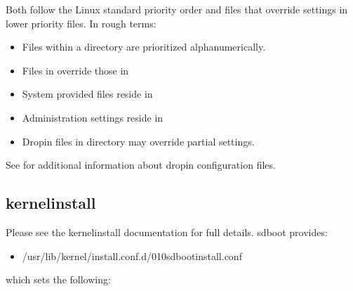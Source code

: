 \documentclass[letterpaper,11pt,english]{sphinxmanual}
\begin{document}
\sphinxAtStartPar
Both follow the Linux standard priority order and  files that over\sphinxhyphen{}ride
settings in lower priority files. In rough terms:
\begin{itemize}
\item {} 
\sphinxAtStartPar
Files within a directory are prioritized alpha\sphinxhyphen{}numerically.

\item {} 
\sphinxAtStartPar
Files in  over\sphinxhyphen{}ride those in 

\item {} 
\sphinxAtStartPar
System provided files reside in 

\item {} 
\sphinxAtStartPar
Administration settings reside in 

\item {} 
\sphinxAtStartPar
Drop\sphinxhyphen{}in files in directory  may override partial settings.

\end{itemize}

\sphinxAtStartPar
See  for additional information about drop\sphinxhyphen{}in configuration files.


\subsection{kernel\sphinxhyphen{}install}
\label{\detokenize{Readme:kernel-install}}
\sphinxAtStartPar
Please see the kernel\sphinxhyphen{}install documentation for full details.
sd\sphinxhyphen{}boot provides:
\begin{itemize}
\item {} 
\sphinxAtStartPar
/usr/lib/kernel/install.conf.d/010\sphinxhyphen{}sd\sphinxhyphen{}boot\sphinxhyphen{}install.conf

\end{itemize}

\sphinxAtStartPar
which sets the following:

\begin{sphinxVerbatim}[commandchars=\\\{\}]
\end{sphinxVerbatim}
\end{document}
